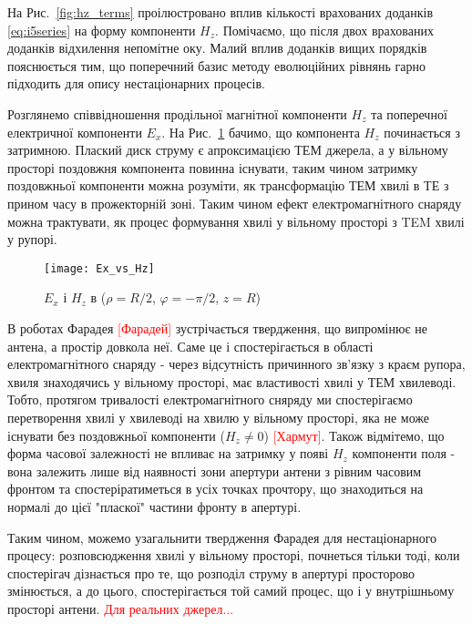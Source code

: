 На Рис.~\ref{fig:hz_terms} проілюстровано вплив кількості врахованих 
доданків \eqref{eq:i5series} на форму компоненти $ H_z $. Помічаємо, що 
після двох врахованих доданків відхилення непомітне оку. Малий вплив 
доданків вищих порядків пояснюється тим, що поперечний базис методу 
еволюційних рівнянь гарно підходить для опису нестаціонарних процесів.

Розглянемо співвідношення продільної магнітної компоненти $ H_z $ та 
поперечної електричної компоненти $ E_x $. На Рис.~\ref{fig:ex_vs_hz}
бачимо, що компонента $ H_z $ починається з затримною. Плаский диск 
струму є апроксимацією ТЕМ джерела, а у вільному просторі поздовжня 
компонента повинна існувати, таким чином затримку поздовжньої 
компоненти можна розуміти, як трансформацію ТЕМ хвилі в ТЕ з прином 
часу в прожекторній зоні. Таким чином ефект електромагнітного снаряду 
можна трактувати, як процес формування хвилі у вільному просторі з TEM 
хвилі у рупорі.

\begin{figure}[h] \begin{center}
\texttt{[image: Ex\_vs\_Hz]}
\caption{$E_x$ і $H_z$ в ($\rho = R/2$, $\varphi = -\pi/2$, $z = R$)} 
\label{fig:ex_vs_hz}
\end{center} \end{figure}

В роботах Фарадея \textcolor{red}{[Фарадей]} зустрічається твердження, що 
випромінює не антена, а простір довкола неї. Саме це і спостерігається в 
області електромагнітного снаряду - через відсутність причинного зв'язку з 
краєм рупора, хвиля знаходячись у вільному просторі, має властивості хвилі у 
ТЕМ хвилеводі. Тобто, протягом тривалості електромагнітного сняряду ми 
спостерігаємо перетворення хвилі у хвилеводі на хвилю у вільному просторі, 
яка не може існувати без поздовжньої компоненти ($ H_z \neq 0 $) 
\textcolor{red}{[Хармут]}. Також відмітемо, що форма часової залежності 
не впливає на затримку у появі $ H_z $ компоненти поля - вона залежить 
лише від наявності зони апертури антени з рівним часовим фронтом та
спостеріратиметься в усіх точках прочтору, що знаходиться на нормалі до 
цієї "пласкої" частини фронту в апертурі.

Таким чином, можемо узагальнити твердження Фарадея для нестаціонарного 
процесу: розповсюдження хвилі у вільному просторі, почнеться тільки тоді, 
коли спостерігач дізнається про те, що розподіл струму в апертурі просторово
змінюється, а до цього, спостерігається той самий процес, що і у 
внутрішньому просторі антени. \textcolor{red}{Для реальних джерел...}

